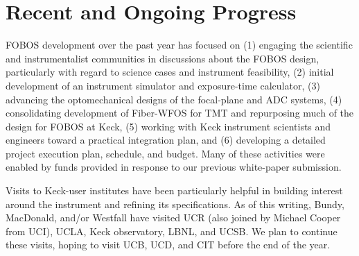 

\section{Recent and Ongoing Progress}
\label{sec:progress}

FOBOS development over the past year has focused on (1) engaging the
scientific and instrumentalist communities in discussions about the
FOBOS design, particularly with regard to science cases and
instrument feasibility, (2) initial development of an instrument
simulator and exposure-time calculator, (3) advancing the
optomechanical designs of the focal-plane and ADC systems, (4)
consolidating development of Fiber-WFOS for TMT and repurposing much
of the design for FOBOS at Keck, (5) working with Keck instrument
scientists and engineers toward a practical integration plan, and (6)
developing a detailed project execution plan, schedule, and budget.
Many of these activities were enabled by funds provided in response
to our previous white-paper submission.

Visits to Keck-user institutes have been particularly helpful in
building interest around the instrument and refining its
specifications. As of this writing, Bundy, MacDonald, and/or Westfall
have visited UCR (also joined by Michael Cooper from UCI), UCLA, Keck
observatory, LBNL, and UCSB. We plan to continue these visits, hoping
to visit UCB, UCD, and CIT before the end of the year.

